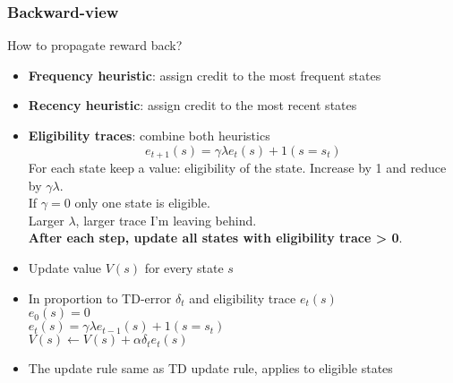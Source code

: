 \subsubsection{Backward-view}
    How to propagate reward back?
    \begin{itemize}
        \item \textbf{Frequency heuristic}: assign credit to the most frequent states
        \item \textbf{Recency heuristic}: assign credit to the most recent states
        \item \textbf{Eligibility traces}: combine both heuristics
        $$e_{t+1}(s)=\gamma \lambda e_t(s)+1(s=s_t)$$
        For each state keep a value: eligibility of the state. Increase by 1 and reduce by $\gamma \lambda$.\\
        If $\gamma=0$ only one state is eligible.\\
        Larger $\lambda$, larger trace I'm leaving behind.\\
        \textbf{After each step, update all states with eligibility trace > 0}.
    \end{itemize}
    \begin{itemize}
        \item Update value $V(s)$ for every state $s$
        \item In proportion to TD-error $\delta_t$ and eligibility trace $e_t(s)$\\
        $e_0(s)=0$\\
        $e_t(s)=\gamma \lambda e_{t-1}(s)+1(s=s_t)$\\
        $V(s)\leftarrow V(s)+\alpha \delta_te_t(s)$
        \item The update rule same as TD update rule, applies to eligible states
    \end{itemize}
